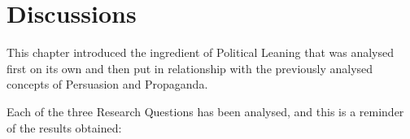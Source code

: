 



\section{\statusgreen Discussions}
\label{sec:ps_discussions}

This chapter introduced the ingredient of Political Leaning that was analysed first on its own and then put in relationship with the previously analysed concepts of Persuasion and Propaganda.

Each of the three Research Questions has been analysed, and this is a reminder of the results obtained:

